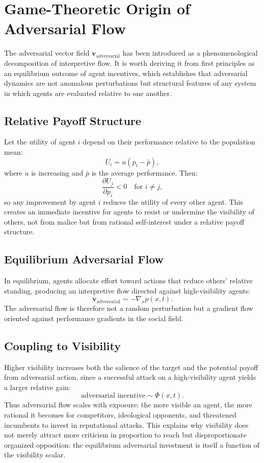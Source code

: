 \documentclass[12pt,a4paper]{article}
\begin{document}
\section{Game-Theoretic Origin of Adversarial Flow}

The adversarial vector field $\mathbf{v}_{\text{adversarial}}$ has been introduced as a phenomenological decomposition of interpretive flow. It is worth deriving it from first principles as an equilibrium outcome of agent incentives, which establishes that adversarial dynamics are not anomalous perturbations but structural features of any system in which agents are evaluated relative to one another.

\subsection{Relative Payoff Structure}

Let the utility of agent $i$ depend on their performance relative to the population mean:
\[
U_i = u(p_i - \bar{p}),
\]
where $u$ is increasing and $\bar{p}$ is the average performance. Then:
\[
\frac{\partial U_j}{\partial p_i} < 0 \quad \text{for } i \neq j,
\]
so any improvement by agent $i$ reduces the utility of every other agent. This creates an immediate incentive for agents to resist or undermine the visibility of others, not from malice but from rational self-interest under a relative payoff structure.

\subsection{Equilibrium Adversarial Flow}

In equilibrium, agents allocate effort toward actions that reduce others' relative standing, producing an interpretive flow directed against high-visibility agents:
\[
\mathbf{v}_{\text{adversarial}} \sim -\nabla_x p(x,t).
\]
The adversarial flow is therefore not a random perturbation but a gradient flow oriented against performance gradients in the social field.

\subsection{Coupling to Visibility}

Higher visibility increases both the salience of the target and the potential payoff from adversarial action, since a successful attack on a high-visibility agent yields a larger relative gain:
\[
\text{adversarial incentive} \sim \Phi(x,t).
\]
Thus adversarial flow scales with exposure: the more visible an agent, the more rational it becomes for competitors, ideological opponents, and threatened incumbents to invest in reputational attacks. This explains why visibility does not merely attract more criticism in proportion to reach but disproportionate organized opposition: the equilibrium adversarial investment is itself a function of the visibility scalar.
\end{document}
